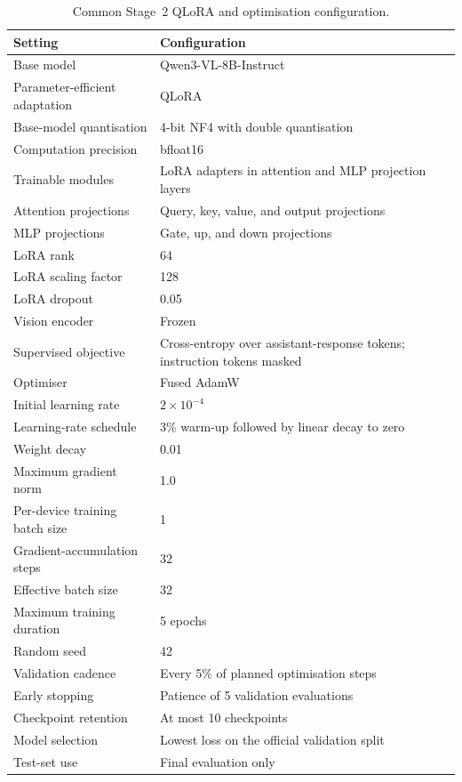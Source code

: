 \begin{table}[htb!]
\centering
\caption{Common Stage~2 QLoRA and optimisation configuration.}
\label{tab:c5:training-configuration}
\begin{tabular}{p{}p{}}
\toprule
Setting & Configuration \\
\midrule
Base model & Qwen3-VL-8B-Instruct \\
Parameter-efficient adaptation & QLoRA \\
Base-model quantisation & 4-bit NF4 with double quantisation \\
Computation precision & bfloat16 \\
Trainable modules & LoRA adapters in attention and MLP projection layers \\
Attention projections & Query, key, value, and output projections \\
MLP projections & Gate, up, and down projections \\
LoRA rank & 64 \\
LoRA scaling factor & 128 \\
LoRA dropout & 0.05 \\
Vision encoder & Frozen \\
Supervised objective & Cross-entropy over assistant-response tokens; instruction tokens masked \\
Optimiser & Fused AdamW \\
Initial learning rate & $2\times10^{-4}$ \\
Learning-rate schedule & 3\% warm-up followed by linear decay to zero \\
Weight decay & 0.01 \\
Maximum gradient norm & 1.0 \\
Per-device training batch size & 1 \\
Gradient-accumulation steps & 32 \\
Effective batch size & 32 \\
Maximum training duration & 5 epochs \\
Random seed & 42 \\
Validation cadence & Every 5\% of planned optimisation steps \\
Early stopping & Patience of 5 validation evaluations \\
Checkpoint retention & At most 10 checkpoints \\
Model selection & Lowest loss on the official validation split \\
Test-set use & Final evaluation only \\
\bottomrule
\end{tabular}
\end{table}

